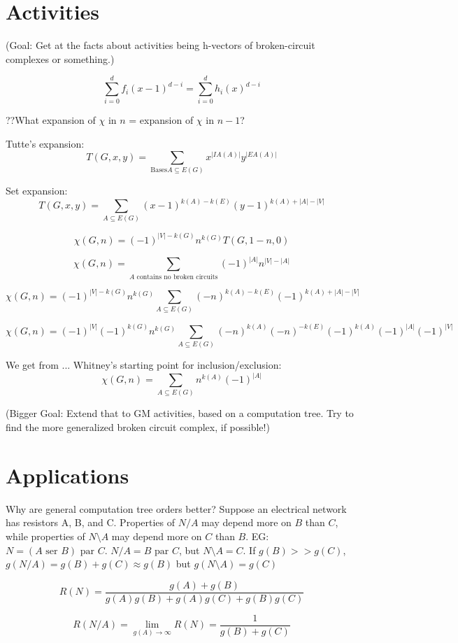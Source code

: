 \documentclass{article}
\begin{document}
\begin{enumerate}
\section{Activities}

(Goal: Get at the facts about activities being h-vectors of broken-circuit complexes or 
something.)


\[
\sum_{i=0}^d f_i(x-1)^{d-i}
=
\sum_{i=0}^d h_i(x)^{d-i}
\]

??What expansion of $\chi$ in $n$ = expansion of $\chi$ in $n-1$?

 

Tutte's expansion:
\[
T(G,x,y) = \sum_{\text{Bases} A\subseteq E(G)}x^{|IA(A)|}y^{|EA(A)|}
\]

Set expansion:
\[
T(G,x,y) = \sum_{A\subseteq E(G)}(x-1)^{k(A)-k(E)}(y-1)^{k(A) + |A| - |V|}
\]

\[
\chi(G,n) = (-1)^{|V|-k(G)}n^{k(G)}T(G,1-n,0)
\]

\[
\chi(G,n) = \sum_{A \text{ contains no broken circuits}}
            (-1)^{|A|}n^{|V|-|A|}
\]


\[
\chi(G,n) = (-1)^{|V|-k(G)}n^{k(G)}\sum_{A\subseteq E(G)}(-n)^{k(A)-k(E)}(-1)^{k(A) + |A| - |V|}
\]

\[
\chi(G,n) = (-1)^{|V|}(-1)^{k(G)}n^{k(G)}\sum_{A\subseteq E(G)}(-n)^{k(A)}(-n)^{-k(E)}(-1)^{k(A)}(-1)^{|A|}(-1)^{|V|}
\]

We get from ... Whitney's starting point for inclusion/exclusion:
\[
\chi(G,n) = \sum_{A\subseteq E(G)}n^{k(A)}(-1)^{|A|}
\]



(Bigger Goal: Extend that to GM activities, based on a computation tree.  Try to find 
the more generalized broken circuit complex, if possible!)

\section{Applications}

Why are general computation tree orders better?  Suppose an electrical network has resistors
A, B, and C.  Properties of $N/A$ may depend more on $B$ than $C$, while properties of
$N\setminus A$ may depend more on $C$ than $B$. EG: $N=(A \text{ ser } B) \text{ par } C$.
$N/A = B \text{ par } C$, but $N\setminus A = C$.  If $g(B) >> g(C)$, 
$g(N/A) = g(B) + g(C) \approx g(B)$
but $g(N\setminus A) = g(C)$ 

\[
R(N) = \frac{g(A)+g(B)}{g(A)g(B)+g(A)g(C)+g(B)g(C)}
\]

\[
R(N/A) = \lim_{g(A)\rightarrow\infty}R(N) = \frac{1}{g(B)+g(C)}
\]


\end{enumerate}
\end{document}
